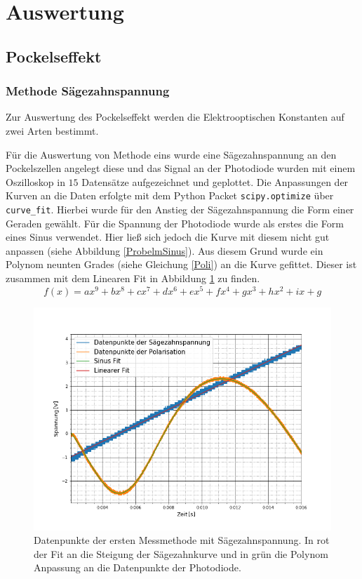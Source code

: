 \section{Auswertung}
\subsection{Pockelseffekt}
\subsubsection{Methode Sägezahnspannung}
Zur Auswertung des Pockelseffekt werden die Elektrooptischen Konstanten auf zwei Arten bestimmt. \par
Für die Auswertung von Methode eins wurde eine Sägezahnspannung an den Pockelszellen angelegt diese und das Signal an der Photodiode wurden mit einem Oszilloskop in $15$ Datensätze aufgezeichnet und geplottet. Die Anpassungen der Kurven an die Daten erfolgte mit dem Python Packet \verb|scipy.optimize| über \verb|curve_fit|. Hierbei wurde für den Anstieg der Sägezahnspannung die Form einer Geraden gewählt. Für die Spannung der Photodiode wurde als erstes die Form eines Sinus verwendet. Hier ließ sich jedoch die Kurve mit diesem nicht gut anpassen (siehe Abbildung \ref{ProbelmSinus}). Aus diesem Grund wurde ein Polynom neunten Grades (siehe Gleichung \ref{Poli}) an die Kurve gefittet. Dieser ist zusammen mit dem Linearen Fit in Abbildung \ref{PoliBild} zu finden.
\begin{equation}
	f(x)=ax^9+bx^8+c x^7+d x^6+ex^5+f x^4+gx^3+hx^2+ix+g
	\label{Poli}
\end{equation}
\begin{figure}[ht]
	\includegraphics[scale=0.5]{Bild/V1_1}
	\centering
	\caption[Plot zu Versuchsteil 1]{\small Datenpunkte der ersten Messmethode mit Sägezahnspannung. In rot der Fit an die Steigung der Sägezahnkurve und in grün die Polynom Anpassung an die Datenpunkte der Photodiode.}
	\label{PoliBild}
\end{figure}
